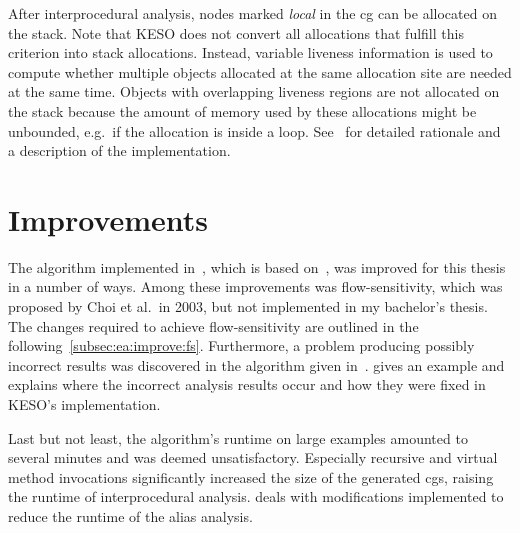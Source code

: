 			After interprocedural analysis, nodes marked \emph{local} in the \gls{cg} can be allocated on the stack. Note that
			KESO does not convert all allocations that fulfill this criterion into stack allocations. Instead, variable
			liveness information is used to compute whether multiple objects allocated at the same allocation site are needed
			at the same time. Objects with overlapping liveness regions are not allocated on the stack because the amount of
			memory used by these allocations might be unbounded, e.g.\ if the allocation is inside a loop.
			See~\cite[Sec.~3.3]{lang:12} for detailed rationale and a description of the implementation.

	\section{Improvements}
		\label{sec:ea:improve}
		The algorithm implemented in~\cite{lang:12}, which is based on~\cite{choi:03:toplas}, was improved for this thesis
		in a number of ways. Among these improvements was flow-sensitivity, which was proposed by Choi et al.\ in 2003, but
		not implemented in my bachelor's thesis. The changes required to achieve flow-sensitivity are outlined in the
		following~\cref{subsec:ea:improve:fs}. Furthermore, a problem producing possibly incorrect
		results was discovered in the algorithm given in~\cite{choi:03:toplas}.  gives an
		example and explains where the incorrect analysis results occur and how they were fixed in KESO's implementation.

		Last but not least, the algorithm's runtime on large examples amounted to several minutes and was deemed
		unsatisfactory. Especially recursive and virtual method invocations significantly increased the size of the
		generated \glspl{cg}, raising the runtime of interprocedural analysis.  deals with
		modifications implemented to reduce the runtime of the alias analysis.

